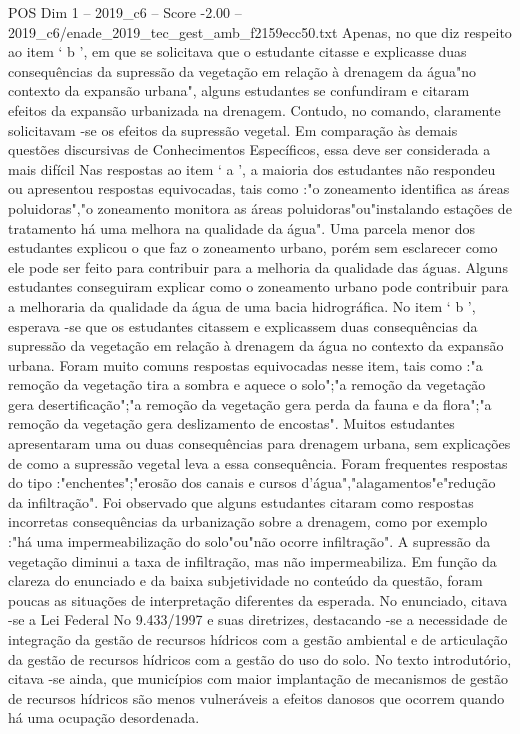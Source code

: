 \begin{textsample}{POS Dim 1 – 2019\_c6 – Score -2.00 – 2019\_c6/enade\_2019\_tec\_gest\_amb\_f2159ecc50.txt}
Apenas, no que diz respeito ao item ‘ b ’, em que se solicitava que o estudante citasse e explicasse duas consequências da supressão da vegetação em relação à drenagem da água"no contexto da expansão urbana", alguns estudantes se confundiram e citaram efeitos da expansão urbanizada na drenagem.
Contudo, no comando, claramente solicitavam -se os efeitos da supressão vegetal.
Em comparação às demais questões discursivas de Conhecimentos Específicos, essa deve ser considerada a mais difícil Nas respostas ao item ‘ a ’, a maioria dos estudantes não respondeu ou apresentou respostas equivocadas, tais como :"o zoneamento identifica as áreas poluidoras","o zoneamento monitora as áreas poluidoras"ou"instalando estações de tratamento há uma melhora na qualidade da água".
Uma parcela menor dos estudantes explicou o que faz o zoneamento urbano, porém sem esclarecer como ele pode ser feito para contribuir para a melhoria da qualidade das águas.
Alguns estudantes conseguiram explicar como o zoneamento urbano pode contribuir para a melhoraria da qualidade da água de uma bacia hidrográfica.
No item ‘ b ’, esperava -se que os estudantes citassem e explicassem duas consequências da supressão da vegetação em relação à drenagem da água no contexto da expansão urbana.
Foram muito comuns respostas equivocadas nesse item, tais como :"a remoção da vegetação tira a sombra e aquece o solo";"a remoção da vegetação gera desertificação";"a remoção da vegetação gera perda da fauna e da flora";"a remoção da vegetação gera deslizamento de encostas".
Muitos estudantes apresentaram uma ou duas consequências para drenagem urbana, sem explicações de como a supressão vegetal leva a essa consequência.
Foram frequentes respostas do tipo :"enchentes";"erosão dos canais e cursos d'água","alagamentos"e"redução da infiltração".
Foi observado que alguns estudantes citaram como respostas incorretas consequências da urbanização sobre a drenagem, como por exemplo :"há uma impermeabilização do solo"ou"não ocorre infiltração".
A supressão da vegetação diminui a taxa de infiltração, mas não impermeabiliza.
Em função da clareza do enunciado e da baixa subjetividade no conteúdo da questão, foram poucas as situações de interpretação diferentes da esperada.
No enunciado, citava -se a Lei Federal No 9.433/1997 e suas diretrizes, destacando -se a necessidade de integração da gestão de recursos hídricos com a gestão ambiental e de articulação da gestão de recursos hídricos com a gestão do uso do solo.
No texto introdutório, citava -se ainda, que municípios com maior implantação de mecanismos de gestão de recursos hídricos são menos vulneráveis a efeitos danosos que ocorrem quando há uma ocupação desordenada.

\end{textsample}
